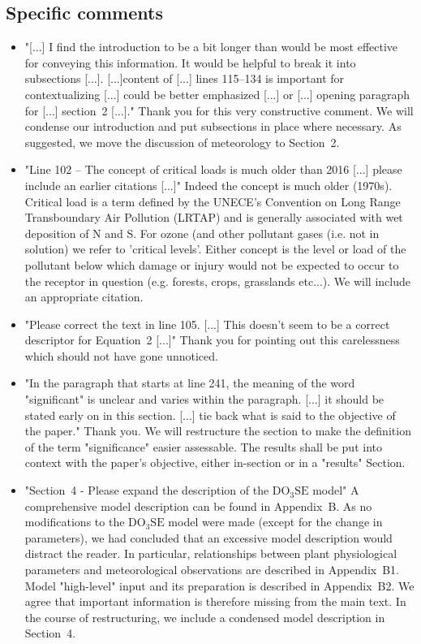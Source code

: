 \documentclass{scrartcl}
\begin{document}
\subsection*{Specific comments}
\begin{itemize}
    
    \item {\color{blue} "[...] I find the introduction to be a bit longer than would be most effective for conveying this information. It would be helpful to break it into subsections [...]. [...]content of [...] lines 115--134 is important for contextualizing [...] could be better emphasized [...] or [...] opening paragraph for [...] section~2 [...]."} Thank you for this very constructive comment. We will condense our introduction and put subsections in place where necessary. As suggested, we move the discussion of meteorology to Section~2.
    \item {\color{blue}"Line 102 -- The concept of critical loads is much older than 2016 [...] please include an earlier citations [...]"} Indeed the concept is much older (1970s). Critical load is a term defined by the UNECE's Convention on Long Range Transboundary Air Pollution (LRTAP) and is generally associated with wet deposition of N and S. For ozone (and other pollutant gases (i.e. not in solution) we refer to 'critical levels'. Either concept is the level or load of the pollutant below which damage or injury would not be expected to occur to the receptor in question (e.g. forests, crops, grasslands etc...). We will include an appropriate citation.   
    \item {\color{blue} "Please correct the text in line 105. [...] This doesn't seem to be a correct descriptor for Equation~2 [...]"} Thank you for pointing out this carelessness which should not have gone unnoticed.
    \item {\color{blue} "In the paragraph that starts at line 241, the meaning of the word "significant" is unclear and varies within the paragraph. [...] it should be stated early on in this section. [...] tie back what is said to the objective of the paper."} Thank you. We will restructure the section to make the definition of the term "significance" easier assessable. The results shall be put into context with the paper's objective, either in-section or in a "results" Section.
    \item {\color{blue} "Section~4 - Please expand the description of the $\mathrm{DO_3SE}$ model"} A comprehensive model description can be found in Appendix~B. As no modifications to the $\mathrm{DO_3SE}$ model were made (except for the change in parameters), we had concluded that an excessive model description would distract the reader. In particular, relationships between plant physiological parameters and meteorological observations are described in Appendix~B1. Model "high-level" input and its preparation is described in Appendix~B2. We agree that important information is therefore missing from the main text. In the course of restructuring, we include a condensed model description in Section~4.

\end{itemize}
\end{document}
